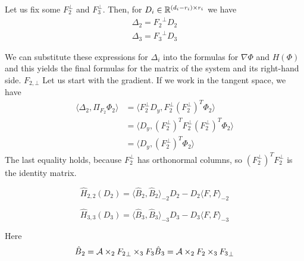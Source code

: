 Let us fix some
$F_{2}^{\bot}$ and $F_3^{\bot}$. Then, for $D_i \in \mathbb{R}^{(d_i - r_i) \times r_i}$
we have
\begin{eqnarray}
    \label{delta_to_d}
\Delta{_2} = {F_2}^{\bot} D{_2} \\
\Delta{_3} = {F_3}^{\bot} D{_3}
\end{eqnarray}

We can substitute these expressions
for $\Delta_i$ into the formulas for $\nabla \Phi$ and $H(\Phi)$
and this yields the final formulas for the matrix of the system
and its right-hand side.
$F_{2, \bot}$
Let us start with the gradient. If we work in the tangent space, we have
\begin{eqnarray}
    \langle \Delta_2, \Pi_{F_2} \Phi_2 \rangle & = \langle F_2^{\bot} D_y, F_2^{\bot} ( F_2^{\bot} )^T \Phi_2 \rangle \\
    & = \langle D_y,( F_2^{\bot})^T  F_2^{\bot} ( F_2^{\bot} )^T \Phi_2 \rangle  \\
    & = \langle D_y, (F_2^{\bot}) ^T \Phi_2 \rangle 
\end{eqnarray}
The last equality holds, because $F_2^{\bot}$ has orthonormal columns, 
so $( F_2^{\bot})^T  F_2^{\bot}$ is the identity matrix.




\begin{equation}
\hat{{H}}_{2,2}(D{_2}) = \langle \hat{B}{_2}, \hat{B}{_2} \rangle_{-2} D{_2} - D{_2} \langle F, F \rangle _{-2}
\end{equation}

\begin{equation}
\hat{{H}}_{3,3}(D{_3}) = \langle \hat{B}{_3}, \hat{B}{_3} \rangle_{-3} D{_3} - D{_3} \langle F, F \rangle _{-3}
\end{equation}

Here
\begin{eqnarray}
\hat{B}{_2} = \mathcal{A} \times_2 {F_2}_{\bot} \times_3 {F_3}
\hat{B}{_3} = \mathcal{A} \times_2 {F_2} \times_3 {F_3}_{\bot}
\end{eqnarray}



